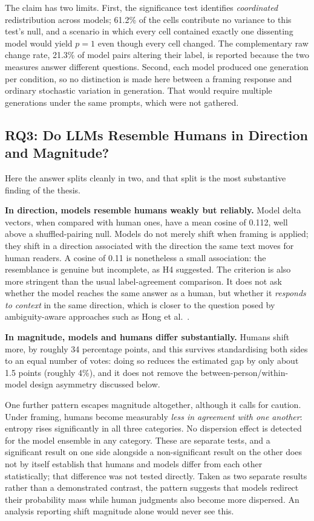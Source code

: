 The claim has two limits. First, the significance test identifies \emph{coordinated}
redistribution across models; 61.2\% of the cells contribute no variance to this test's null, and
a scenario in which every cell contained exactly one dissenting model would yield $p = 1$ even
though every cell changed. The complementary raw change rate, 21.3\% of model pairs altering their
label, is reported because the two measures answer different questions. Second, each model
produced one generation per condition, so no distinction is made here between a framing response
and ordinary stochastic variation in generation. That would require multiple generations under the
same prompts, which were not gathered.

\subsection{RQ3: Do LLMs Resemble Humans in Direction and Magnitude?}
\label{disc:rq3}

\noindent
Here the answer splits cleanly in two, and that split is the most substantive finding
of the thesis.

\textbf{In direction, models resemble humans weakly but reliably.} Model delta vectors, when
compared with human ones, have a mean cosine of 0.112, well above a shuffled-pairing null. Models
do not merely shift when framing is applied; they shift in a direction associated with the
direction the same text moves for human readers. A cosine of 0.11 is nonetheless a small
association: the resemblance is genuine but incomplete, as H4 suggested. The criterion is also
more stringent than the usual label-agreement comparison. It does not ask whether the model
reaches the same answer as a human, but whether it \emph{responds to context} in the same
direction, which is closer to the question posed by ambiguity-aware approaches such as Hong et
al.\ \citeyear{Hong2024AERLLM}.

\textbf{In magnitude, models and humans differ substantially.} Humans shift more, by roughly 34
percentage points, and this survives standardising both sides to an equal number of votes: doing
so reduces the estimated gap by only about 1.5 points (roughly 4\%), and it does not remove the
between-person/within-model design asymmetry discussed below.

One further pattern escapes magnitude altogether, although it calls for caution. Under framing,
humans become measurably \emph{less in agreement with one another}: entropy rises significantly in
all three categories. No dispersion effect is detected for the model ensemble in any category.
These are separate tests, and a significant result on one side alongside a non-significant result
on the other does not by itself establish that humans and models differ from each other
statistically; that difference was not tested directly. Taken as two separate results rather
than a demonstrated contrast, the pattern suggests that models redirect their probability mass
while human judgments also become more dispersed. An analysis reporting shift magnitude alone
would never see this.

